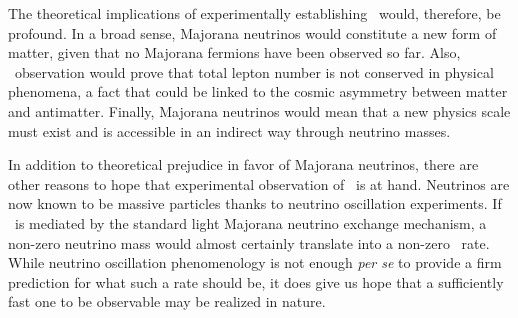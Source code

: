 The theoretical implications of experimentally establishing \bbonu\ would, therefore, be profound. In a broad sense, Majorana neutrinos would constitute a new form of matter, given that no Majorana fermions have been observed so far. Also, \bbonu\ observation would prove that total lepton number is not conserved in physical phenomena, a fact that could be linked to the cosmic asymmetry between matter and antimatter.  Finally, Majorana neutrinos would mean that a new physics scale must exist and is accessible in an indirect way through neutrino masses. 

In addition to theoretical prejudice in favor of Majorana neutrinos, there are other reasons to hope that experimental observation of \bbonu\ is at hand. Neutrinos are now known to be massive particles thanks to neutrino oscillation experiments. If \bbonu\ is mediated by the standard light Majorana neutrino exchange mechanism, a non-zero neutrino mass would almost certainly translate into a non-zero \bbonu\ rate. While neutrino oscillation phenomenology is not enough \emph{per se} to provide a firm prediction for what such a rate should be, it does give us hope that a sufficiently fast one to be observable may be realized in nature. 

